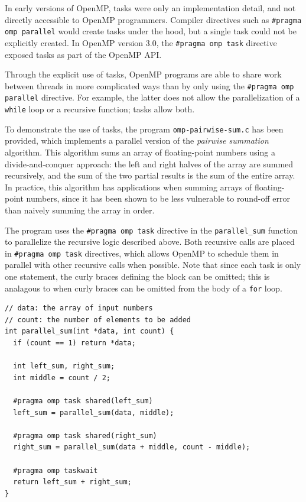 \documentclass{article}
\theoremstyle{definition}
\begin{document}
In early versions of OpenMP, tasks were only an implementation detail, and not directly accessible to OpenMP programmers. Compiler directives such as \texttt{\#pragma omp parallel} would create tasks under the hood, but a single task could not be explicitly created. In OpenMP version 3.0, the \texttt{\#pragma omp task} directive exposed tasks as part of the OpenMP API.

Through the explicit use of tasks, OpenMP programs are able to share work between threads in more complicated ways than by only using the \texttt{\#pragma omp parallel} directive. For example, the latter does not allow the parallelization of a \texttt{while} loop or a recursive function; tasks allow both.

To demonstrate the use of tasks, the program \texttt{omp-pairwise-sum.c} has been provided, which implements a parallel version of the \emph{pairwise summation} algorithm. This algorithm sums an array of floating-point numbers using a divide-and-conquer approach: the left and right halves of the array are summed recursively, and the sum of the two partial results is the sum of the entire array. In practice, this algorithm has applications when summing arrays of floating-point numbers, since it has been shown to be less vulnerable to round-off error than naively summing the array in order. 

The program uses the \texttt{\#pragma omp task} directive in the \texttt{parallel\_sum} function to parallelize the recursive logic described above. Both recursive calls are placed in \texttt{\#pragma omp task} directives, which allows OpenMP to schedule them in parallel with other recursive calls when possible. Note that since each task is only one statement, the curly braces defining the block can be omitted; this is analagous to when curly braces can be omitted from the body of a \texttt{for} loop.

\begin{verbatim}
// data: the array of input numbers
// count: the number of elements to be added
int parallel_sum(int *data, int count) {
  if (count == 1) return *data;

  int left_sum, right_sum;
  int middle = count / 2;

  #pragma omp task shared(left_sum)
  left_sum = parallel_sum(data, middle);

  #pragma omp task shared(right_sum)
  right_sum = parallel_sum(data + middle, count - middle);

  #pragma omp taskwait
  return left_sum + right_sum;
}\end{verbatim}
\end{document}
